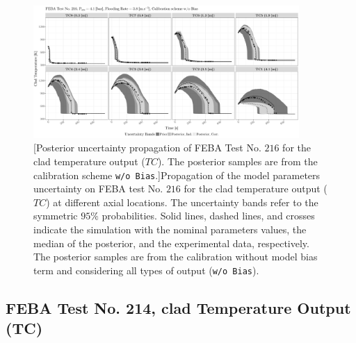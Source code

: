 \clearpage
\begin{figure}
	\centering
	\includegraphics[width=0.90\textwidth]{../figures/chapter5/figures/plotTraceUQPosteriorAllNoDiscNoBCTC216}
		[Posterior uncertainty propagation of FEBA Test No. $216$ for the clad temperature output ($TC$). The posterior samples are from the calibration scheme \texttt{w/o Bias}.]{Propagation of the model parameters uncertainty on FEBA test No. $216$ for the clad temperature output ($TC$) at different axial locations. The uncertainty bands refer to the symmetric $95\%$ probabilities. Solid lines, dashed lines, and crosses indicate the simulation with the nominal parameters values, the median of the posterior, and the experimental data, respectively. The posterior samples are from the calibration without model bias term and considering all types of output (\texttt{w/o Bias}).}
	\label{fig:ch5_plot_trace_uq_post_tc_216_nodisc}
\end{figure}
\clearpage

\subsection{FEBA Test No. 214, clad Temperature Output (TC)}\label{app:tbl_results_uq_post_tc_214}


